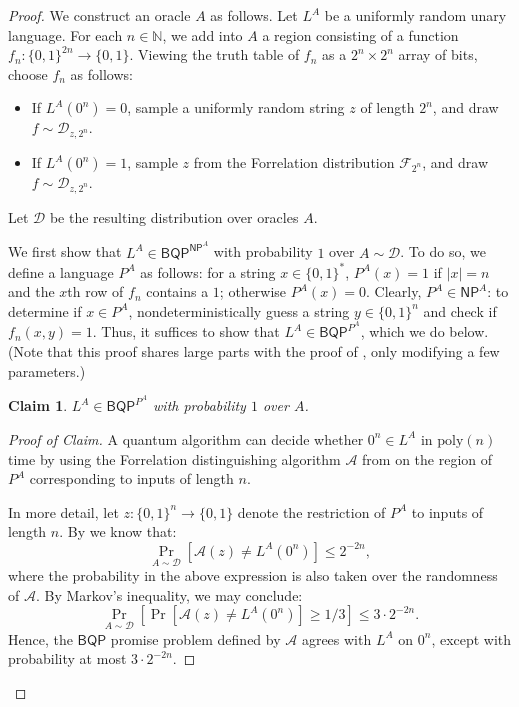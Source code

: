 \documentclass[11pt]{article}%
\newtheorem{claim}[theorem]{Claim}
\newcommand{\Naturals}{\mathbb{N}}
\newcommand{\poly}{\mathrm{poly}}
\begin{document}
\begin{proof}
We construct an oracle $A$ as follows. Let $L^A$ be a uniformly random unary language. For each $n \in \Naturals$, we add into $A$ a region consisting of a function $f_n: \{0,1\}^{2n} \to \{0,1\}$. Viewing the truth table of $f_n$ as a $2^{n} \times 2^{n}$ array of bits, choose $f_n$ as follows:
\begin{itemize}
\item If $L^A\left(0^n\right) = 0$, sample a uniformly random string $z$ of length $2^{n}$, and draw $f \sim \mathcal{D}_{z,2^{n}}$.
\item If $L^A\left(0^n\right) = 1$, sample $z$ from the Forrelation distribution $\mathcal{F}_{2^{n}}$, and draw $f \sim \mathcal{D}_{z,2^{n}}$.
\end{itemize}
Let $\mathcal{D}$ be the resulting distribution over oracles $A$.

We first show that $L^A \in \mathsf{BQP}^{\mathsf{NP}^A}$ with probability $1$ over $A \sim \mathcal{D}$. To do so, we define a language $P^A$ as follows: for a string $x \in \{0,1\}^*$, $P^A(x) = 1$ if $|x| = n$ and the $x$th row of $f_n$ contains a $1$; otherwise $P^A(x) = 0$. Clearly, $P^A \in \mathsf{NP}^A$: to determine if $x \in P^A$, nondeterministically guess a string $y \in \{0,1\}^{n}$ and check if $f_n(x, y) = 1$. Thus, it suffices to show that $L^A \in \mathsf{BQP}^{P^A}$, which we do below. (Note that this proof shares large parts with the proof of , only modifying a few parameters.)

\begin{claim}
\label{claim:l_in_bqp^p^a}
$L^A \in \mathsf{BQP}^{P^A}$ with probability $1$ over $A$.
\end{claim}

\begin{proof}[Proof of Claim]
A quantum algorithm can decide whether $0^{n} \in L^A$ in $\poly(n)$ time by using the Forrelation distinguishing algorithm $\mathcal{A}$ from  on the region of $P^A$ corresponding to inputs of length $n$.

In more detail, let $z: \{0,1\}^{n} \to \{0,1\}$ denote the restriction of $P^A$ to inputs of length $n$. By  we know that:
\[
\Pr_{A \sim \mathcal{D}} \left[\mathcal{A}(z) \neq L^A\left(0^{n}\right)\right] \le 2^{-2n},
\]
where the probability in the above expression is also taken over the randomness of $\mathcal{A}$. By Markov's inequality, we may conclude:
\[
\Pr_{A \sim \mathcal{D}} \left[\Pr\left[\mathcal{A}(z) \neq L^A\left(0^{n}\right)\right] \ge 1/3\right] \le 3 \cdot 2^{-2n}.
\]
Hence, the $\mathsf{BQP}$ promise problem defined by $\mathcal{A}$ agrees with $L^A$ on $0^{n}$, except with probability at most $3 \cdot 2^{-2n}$.


\end{proof}
\end{proof}
\end{document}
